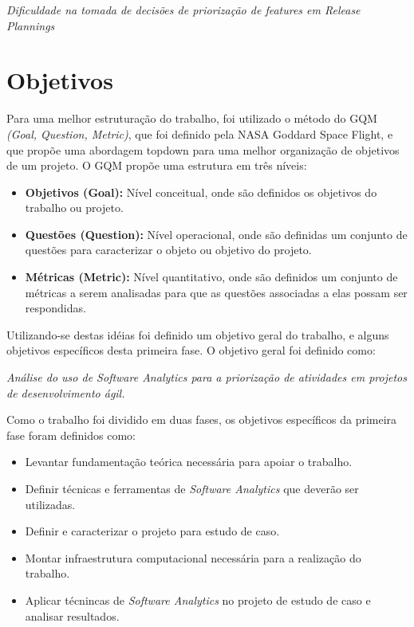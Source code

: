 \begin{center}
 \textit{Dificuldade na tomada de decisões de priorização de features em
  Release Plannings}
\end{center}

\section{Objetivos}

Para uma melhor estruturação do trabalho, foi utilizado o método do
GQM \textit{(Goal, Question, Metric)}, que foi definido pela NASA Goddard Space
Flight, e que propõe uma abordagem topdown para uma melhor organização de objetivos
de um projeto. O GQM propõe uma estrutura em três níveis\cite{gqm}:

\begin{itemize}
    \item \textbf{Objetivos (Goal):} Nível conceitual, onde são definidos os
        objetivos do trabalho ou projeto.
    \item \textbf{Questões (Question):} Nível operacional, onde são definidas um
        conjunto de questões para caracterizar o objeto ou objetivo do projeto.
    \item \textbf{Métricas (Metric):} Nível quantitativo, onde são definidos um
        conjunto de métricas a serem analisadas para que as questões associadas
        a elas possam ser respondidas.
\end{itemize}

Utilizando-se destas idéias foi definido um objetivo geral do trabalho, e alguns
objetivos específicos desta primeira fase. O objetivo geral foi definido como:

\begin{center}
    \textit{Análise do uso de Software Analytics para a priorização
        de atividades em projetos de desenvolvimento ágil.}
\end{center}

Como o trabalho foi dividido em duas fases, os objetivos específicos da primeira
fase foram definidos como:

\begin{itemize}
    \item Levantar fundamentação teórica necessária para apoiar o trabalho.
    \item Definir técnicas e ferramentas de \textit{Software Analytics} que deverão ser utilizadas.
    \item Definir e caracterizar o projeto para estudo de caso.
    \item Montar infraestrutura computacional necessária para a realização do trabalho.
    \item Aplicar técnincas de \textit{Software Analytics} no projeto de estudo de caso e analisar resultados.
\end{itemize}

